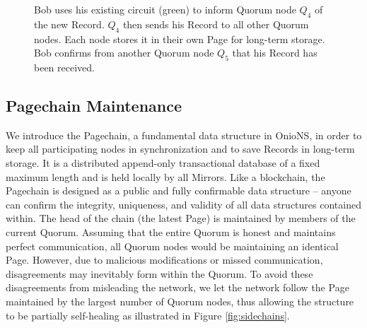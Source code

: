 \begin{figure}[htbp]
	\caption{Bob uses his existing circuit (green) to inform Quorum node $ Q_{4} $ of the new Record. $ Q_{4} $ then sends his Record to all other Quorum nodes. Each node stores it in their own Page for long-term storage. Bob confirms from another Quorum node $ Q_{5} $ that his Record has been received.}
	\label{fig:recordBroadcast}
\end{figure}

\subsection{Pagechain Maintenance}

We introduce the Pagechain, a fundamental data structure in OnioNS, in order to keep all participating nodes in synchronization and to save Records in long-term storage. It is a distributed append-only transactional database of a fixed maximum length and is held locally by all Mirrors. Like a blockchain, the Pagechain is designed as a public and fully confirmable data structure -- anyone can confirm the integrity, uniqueness, and validity of all data structures contained within. The head of the chain (the latest Page) is maintained by members of the current Quorum. Assuming that the entire Quorum is honest and maintains perfect communication, all Quorum nodes would be maintaining an identical Page. However, due to malicious modifications or missed communication, disagreements may inevitably form within the Quorum. To avoid these disagreements from misleading the network, we let the network follow the Page maintained by the largest number of Quorum nodes, thus allowing the structure to be partially self-healing as illustrated in Figure \ref{fig:sidechains}.

